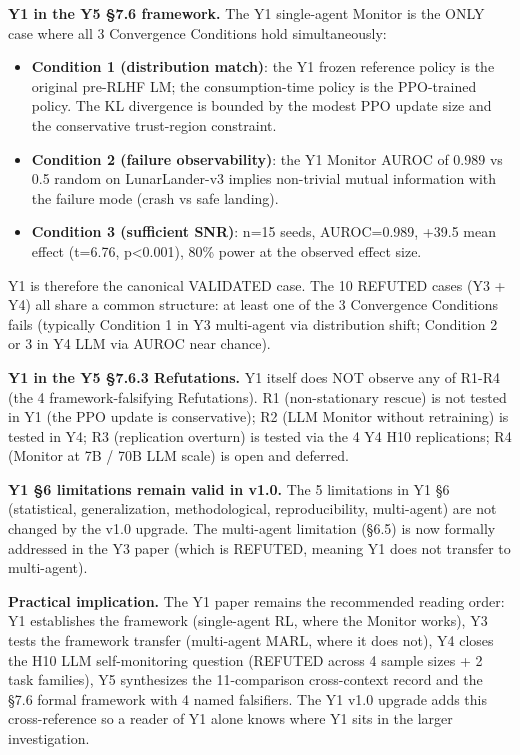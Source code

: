 \documentclass[
]{article}
\providecommand{\tightlist}{%
  \setlength{\itemsep}{0pt}\setlength{\parskip}{0pt}}
\begin{document}
\textbf{Y1 in the Y5 §7.6 framework.} The Y1 single-agent Monitor is the
ONLY case where all 3 Convergence Conditions hold simultaneously:

\begin{itemize}
\tightlist
\item
  \textbf{Condition 1 (distribution match)}: the Y1 frozen reference
  policy is the original pre-RLHF LM; the consumption-time policy is the
  PPO-trained policy. The KL divergence is bounded by the modest PPO
  update size and the conservative trust-region constraint.
\item
  \textbf{Condition 2 (failure observability)}: the Y1 Monitor AUROC of
  0.989 vs 0.5 random on LunarLander-v3 implies non-trivial mutual
  information with the failure mode (crash vs safe landing).
\item
  \textbf{Condition 3 (sufficient SNR)}: n=15 seeds, AUROC=0.989, +39.5
  mean effect (t=6.76, p\textless0.001), 80\% power at the observed
  effect size.
\end{itemize}

Y1 is therefore the canonical VALIDATED case. The 10 REFUTED cases (Y3 +
Y4) all share a common structure: at least one of the 3 Convergence
Conditions fails (typically Condition 1 in Y3 multi-agent via
distribution shift; Condition 2 or 3 in Y4 LLM via AUROC near chance).

\textbf{Y1 in the Y5 §7.6.3 Refutations.} Y1 itself does NOT observe any
of R1-R4 (the 4 framework-falsifying Refutations). R1 (non-stationary
rescue) is not tested in Y1 (the PPO update is conservative); R2 (LLM
Monitor without retraining) is tested in Y4; R3 (replication overturn)
is tested via the 4 Y4 H10 replications; R4 (Monitor at 7B / 70B LLM
scale) is open and deferred.

\textbf{Y1 §6 limitations remain valid in v1.0.} The 5 limitations in Y1
§6 (statistical, generalization, methodological, reproducibility,
multi-agent) are not changed by the v1.0 upgrade. The multi-agent
limitation (§6.5) is now formally addressed in the Y3 paper (which is
REFUTED, meaning Y1 does not transfer to multi-agent).

\textbf{Practical implication.} The Y1 paper remains the recommended
reading order: Y1 establishes the framework (single-agent RL, where the
Monitor works), Y3 tests the framework transfer (multi-agent MARL, where
it does not), Y4 closes the H10 LLM self-monitoring question (REFUTED
across 4 sample sizes + 2 task families), Y5 synthesizes the
11-comparison cross-context record and the §7.6 formal framework with 4
named falsifiers. The Y1 v1.0 upgrade adds this cross-reference so a
reader of Y1 alone knows where Y1 sits in the larger investigation.
\end{document}
